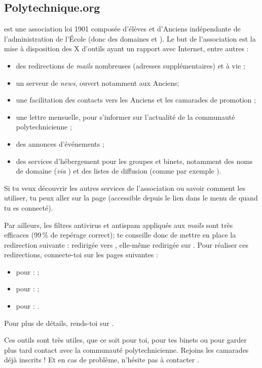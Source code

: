 \subsection{Polytechnique.org}
 est une association loi 1901 composée d'élèves et d'Anciens
 indépendante de l'administration de l'\'Ecole (donc des domaines 
 et ). Le but de l'association est la mise à disposition des X d'outils
ayant un rapport avec Internet, entre autres :
\begin{itemize}
  \item des redirections de \emph{mails} nombreuses (adresses supplémentaires) et à vie ;
  \item un serveur de \emph{news}, ouvert notamment aux Anciens;
  \item une facilitation des contacts vers les Anciens et les camarades de promotion ;
  \item une lettre mensuelle, pour s'informer sur l'actualité de la communauté polytechnicienne ;
  \item des annonces d'événements ;
  \item des services d'hébergement pour les groupes et binets, notamment des noms de domaine (\emph{via} ) et des listes de diffusion (comme par exemple ).
\end{itemize}
Si tu veux découvrir les autres services de l'association ou savoir
comment les utiliser, tu peux aller sur la page
 (accessible depuis
le lien  dans le menu de 
quand tu es connecté).

Par ailleurs, les filtres antivirus et antispam appliqués aux \emph{mails} sont très efficaces (99\,\% de repérage correct);  te conseille donc de mettre en place la redirection suivante :
redirigée vers ,
elle-même redirigée sur .
Pour réaliser ces redirections, connecte-toi sur les pages suivantes :
\begin{itemize}
  \item pour  :  ;
  \item pour  :  ;
  \item pour  : .
\end{itemize}
Pour plus de détails, rends-toi sur .


 Ces outils sont très utiles, que
ce soit pour toi, pour tes binets ou pour garder plus tard contact avec la communauté polytechnicienne. Rejoins
les  camarades déjà inscrits ! Et en cas de problème, n'hésite pas à contacter
.
